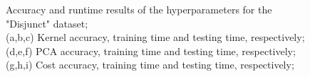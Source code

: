 \documentclass[conference]{IEEEtran}
\begin{document}
\begin{figure}[ht!]
    \quad
    \quad
    \quad

    \caption{
        \color{maxim}
        Accuracy and runtime results of the hyperparameters for the "Disjunct" dataset; \\ 
        (a,b,c) Kernel accuracy, training time and testing time, respectively; (d,e,f) PCA accuracy, training time and testing time, respectively; (g,h,i) Cost accuracy, training time and testing time, respectively;
    }
    \label{fig:hyper:svm_param_disjunct}
\end{figure}
\end{document}
